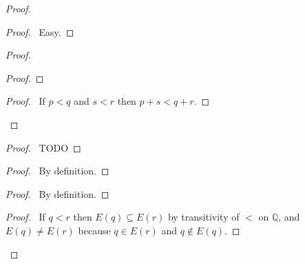 \documentclass{article}
\let\qed\relax
\theoremstyle{definition}
\begin{document}
    \begin{proof}
        \pf
        \begin{proof}
            \pf\ Easy.
        \end{proof}
        \begin{proof}
            \begin{proof}
            \end{proof}
            \begin{proof}
                \pf\ If $p < q$ and $s < r$ then $p+s < q+r$.
            \end{proof}
        \end{proof}
        \begin{proof}
            \pf\ TODO
        \end{proof}
        \begin{proof}
            \pf\ By definition.
        \end{proof}
        \begin{proof}
            \pf\ By definition.
        \end{proof}
        \begin{proof}
            \pf\ If $q < r$ then $E(q) \subseteq E(r)$ by transitivity of $<$ on $\mathbb{Q}$,
            and $E(q) \neq E(r)$ because $q \in E(r)$ and $q \notin E(q)$.
        \end{proof}
        \qed
    \end{proof}
\end{document}
